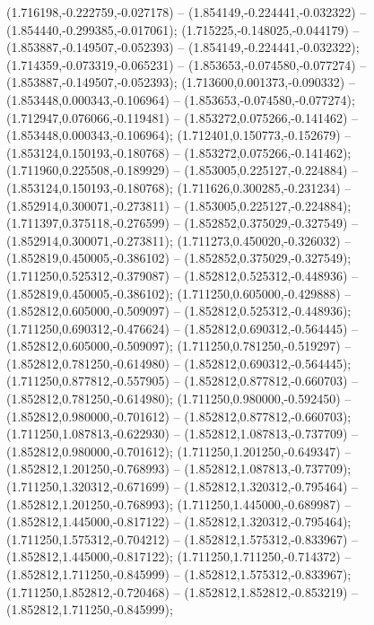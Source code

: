  (1.716198,-0.222759,-0.027178) -- (1.854149,-0.224441,-0.032322) -- (1.854440,-0.299385,-0.017061);
 (1.715225,-0.148025,-0.044179) -- (1.853887,-0.149507,-0.052393) -- (1.854149,-0.224441,-0.032322);
 (1.714359,-0.073319,-0.065231) -- (1.853653,-0.074580,-0.077274) -- (1.853887,-0.149507,-0.052393);
 (1.713600,0.001373,-0.090332) -- (1.853448,0.000343,-0.106964) -- (1.853653,-0.074580,-0.077274);
 (1.712947,0.076066,-0.119481) -- (1.853272,0.075266,-0.141462) -- (1.853448,0.000343,-0.106964);
 (1.712401,0.150773,-0.152679) -- (1.853124,0.150193,-0.180768) -- (1.853272,0.075266,-0.141462);
 (1.711960,0.225508,-0.189929) -- (1.853005,0.225127,-0.224884) -- (1.853124,0.150193,-0.180768);
 (1.711626,0.300285,-0.231234) -- (1.852914,0.300071,-0.273811) -- (1.853005,0.225127,-0.224884);
 (1.711397,0.375118,-0.276599) -- (1.852852,0.375029,-0.327549) -- (1.852914,0.300071,-0.273811);
 (1.711273,0.450020,-0.326032) -- (1.852819,0.450005,-0.386102) -- (1.852852,0.375029,-0.327549);
 (1.711250,0.525312,-0.379087) -- (1.852812,0.525312,-0.448936) -- (1.852819,0.450005,-0.386102);
 (1.711250,0.605000,-0.429888) -- (1.852812,0.605000,-0.509097) -- (1.852812,0.525312,-0.448936);
 (1.711250,0.690312,-0.476624) -- (1.852812,0.690312,-0.564445) -- (1.852812,0.605000,-0.509097);
 (1.711250,0.781250,-0.519297) -- (1.852812,0.781250,-0.614980) -- (1.852812,0.690312,-0.564445);
 (1.711250,0.877812,-0.557905) -- (1.852812,0.877812,-0.660703) -- (1.852812,0.781250,-0.614980);
 (1.711250,0.980000,-0.592450) -- (1.852812,0.980000,-0.701612) -- (1.852812,0.877812,-0.660703);
 (1.711250,1.087813,-0.622930) -- (1.852812,1.087813,-0.737709) -- (1.852812,0.980000,-0.701612);
 (1.711250,1.201250,-0.649347) -- (1.852812,1.201250,-0.768993) -- (1.852812,1.087813,-0.737709);
 (1.711250,1.320312,-0.671699) -- (1.852812,1.320312,-0.795464) -- (1.852812,1.201250,-0.768993);
 (1.711250,1.445000,-0.689987) -- (1.852812,1.445000,-0.817122) -- (1.852812,1.320312,-0.795464);
 (1.711250,1.575312,-0.704212) -- (1.852812,1.575312,-0.833967) -- (1.852812,1.445000,-0.817122);
 (1.711250,1.711250,-0.714372) -- (1.852812,1.711250,-0.845999) -- (1.852812,1.575312,-0.833967);
 (1.711250,1.852812,-0.720468) -- (1.852812,1.852812,-0.853219) -- (1.852812,1.711250,-0.845999);
